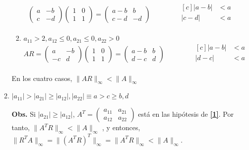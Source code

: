 \documentclass{article}
\newcommand\tab[1][0.6cm]{\hspace*{#1}}
\newcommand\nl{\newline\tab}
\begin{document}
\begin{enumerate}
\begin{enumerate}
\begin{enumerate}
$$\begin{pmatrix}
				a & -b \\
				c & -d 
				\end{pmatrix} 
				\begin{pmatrix}
				1 & 0 \\
				1 & 1 
				\end{pmatrix} = 
				\begin{pmatrix}
				a-b & b \\
				c-d & -d 
				\end{pmatrix}
				\qquad\qquad
				\begin{aligned}[c]
				|a - b| &< a\\
				|c - d| &< a\\
				\end{aligned}
				$$
				\item $a_{11} > 2, a_{12} \leq 0, a_{21} \leq 0, a_{22} > 0$ \nl
				$$
				AR = 
				\begin{pmatrix}
				a & -b \\
				-c & d 
				\end{pmatrix} 
				\begin{pmatrix}
				1 & 0 \\
				1 & 1 
				\end{pmatrix} = 
				\begin{pmatrix}
				a-b & b \\
				d-c & d 
				\end{pmatrix}
				\qquad\qquad
				\begin{aligned}[c]
				|a - b| &< a\\
				|d - c| &< a\\
				\end{aligned}
				$$
			\end{enumerate}
			
			En los cuatro casos, $\| AR \|_\infty < \|A\|_\infty$\nl
			
			
			\item  
			$|a_{11}| > |a_{21}| \geq |a_{12}|, |a_{22}| \equiv a > c \geq b, d $ \nl
			
			
			\textbf{Obs.} \nl  Si $|a_{21}| \geq |a_{12}|$, 
			$
			A^T = 
			\begin{pmatrix}
			a_{11} & a_{21} \\
			a_{12} & a_{22} 
			\end{pmatrix} $ 
			está en las hipótesis de \textbf{\ref{1}}.\nl		
			Por tanto,
			$
			\| A^TR \|_\infty < \|A\|_\infty 
			$
			, y entonces,
			$ \| R^TA \|_\infty = \| \left( A^TR\right) ^T \|_\infty = \| A^TR \|_\infty < \|A\|_\infty 
			$.\nl
			

\end{enumerate}
\end{enumerate}
\end{document}
